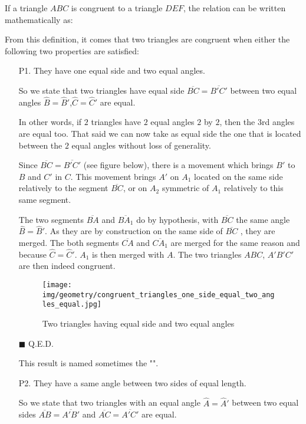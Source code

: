 	If a triangle $ABC$ is congruent to a triangle $DEF$, the relation can be written mathematically as:
	

	From this definition, it comes that two triangles are congruent when either the following two properties are satisfied:
	\begin{enumerate}
		\item[P1.] They have one equal side and two equal angles.
		\begin{dem}
		So we state that two triangles have equal side $\overline{BC} = \overline{B'C'}$ between two equal angles $\hat{B}=\hat{B}'$,$\hat{C}=\hat{C}'$ are equal.
		
		In other words, if $2$ triangles have $2$ equal angles $2$ by $2$, then the $3$rd angles are equal too. That said we can now take as equal side the one that is located between the $2$ equal angles without loss of generality.

	Since $\overline{BC} = \overline{B'C'}$ (see figure below), there is a movement which brings $B'$ to $B$ and $C'$ in $C$. This movement brings $A'$ on $A_1$ located on the same side relatively to the segment $\overline{BC}$, or on $A_2$ symmetric of $A_1$ relatively to this same segment.

	The two segments $\overline{BA}$ and  $\overline{BA_1}$ do by hypothesis, with  $\overline{BC}$  the same angle $\hat{B}=\hat{B}'$. As they are by construction on the same side of  $\overline{BC}$ , they are merged. The both segments  $\overline{CA}$ and $\overline{CA_1}$  are merged for the same reason and because  $\hat{C}=\hat{C}'$. $A_1$ is then merged with $A$. The two triangles $ABC$, $A'B'C'$ are then indeed congruent.
		\begin{figure}[H]
			\centering
			\texttt{[image: img/geometry/congruent\_triangles\_one\_side\_equal\_two\_angles\_equal.jpg]}
			\caption{Two triangles having equal side and two equal angles}
		\end{figure}
		\begin{flushright}
			$\blacksquare$  Q.E.D.
		\end{flushright}
		\end{dem}
		This result is named sometimes the "\index{angle-side-angle theorem}".

		\item[P2.] They have a same angle between two sides of equal length.
		\begin{dem}
		So we state that two triangles with an equal angle $\hat{A}=\hat{A}'$ between two equal sides $\overline{AB} = \overline{A'B '}$ and $\overline{AC}= \overline{A'C'}$ are equal.
		

\end{dem}
\end{enumerate}
